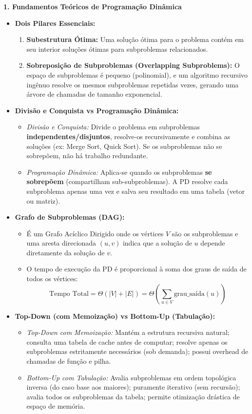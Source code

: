 \documentclass[11pt,a4paper]{article}
\newcommand{\topico}[1]{\par\medskip\textbf{\color{azul}#1}\par}
\begin{document}
\topico{1. Fundamentos Teóricos de Programação Dinâmica}
\begin{itemize}
  \item \textbf{Dois Pilares Essenciais:}
  \begin{enumerate}
    \item \textbf{Subestrutura Ótima:} Uma solução ótima para o problema contém em seu interior soluções ótimas para subproblemas relacionados.
    \item \textbf{Sobreposição de Subproblemas (Overlapping Subproblems):} O espaço de subproblemas é pequeno (polinomial), e um algoritmo recursivo ingênuo resolve os mesmos subproblemas repetidas vezes, gerando uma árvore de chamadas de tamanho exponencial.
  \end{enumerate}
  \item \textbf{Divisão e Conquista vs Programação Dinâmica:}
  \begin{itemize}
    \item \textit{Divisão e Conquista:} Divide o problema em subproblemas \textbf{independentes/disjuntos}, resolve-os recursivamente e combina as soluções (ex: Merge Sort, Quick Sort). Se os subproblemas não se sobrepõem, não há trabalho redundante.
    \item \textit{Programação Dinâmica:} Aplica-se quando os subproblemas \textbf{se sobrepõem} (compartilham sub-subproblemas). A PD resolve cada subproblema apenas uma vez e salva seu resultado em uma tabela (vetor ou matriz).
  \end{itemize}
  \item \textbf{Grafo de Subproblemas (DAG):}
  \begin{itemize}
    \item É um Grafo Acíclico Dirigido onde os vértices $V$ são os subproblemas e uma aresta direcionada $(u, v)$ indica que a solução de $u$ depende diretamente da solução de $v$.
    \item O tempo de execução da PD é proporcional à soma dos graus de saída de todos os vértices:
    \[
    \text{Tempo Total} = \Theta(|V| + |E|) = \Theta\left(\sum_{u \in V} \text{grau\_saída}(u)\right)
    \]
  \end{itemize}
  \item \textbf{Top-Down (com Memoização) vs Bottom-Up (Tabulação):}
  \begin{itemize}
    \item \textit{Top-Down com Memoização:} Mantém a estrutura recursiva natural; consulta uma tabela de cache antes de computar; resolve apenas os subproblemas estritamente necessários (sob demanda); possui overhead de chamadas de função e pilha.
    \item \textit{Bottom-Up com Tabulação:} Avalia subproblemas em ordem topológica inversa (do caso base aos maiores); puramente iterativo (sem recursão); avalia todos os subproblemas da tabela; permite otimização drástica de espaço de memória.
  \end{itemize}
\end{itemize}
\end{document}
